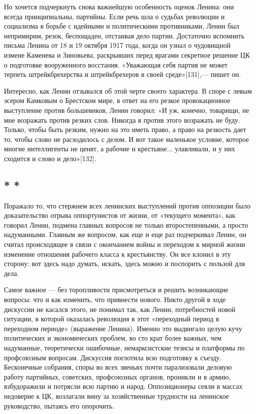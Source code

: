\documentclass[12pt, a4paper, openany]{book}
\begin{document}
Но хочется подчеркнуть снова важнейшую особенность оценок Ленина: они всегда принципиальны, партийны. Если речь шла о судьбах революции и социализма в борьбе с идейными и политическими противниками, Ленин был непримирим, резок, беспощаден, отстаивая дело партии. Достаточно вспомнить письма Ленина от 18 и 19 октября 1917 года, когда он узнал о чудовищной измене Каменева и Зиновьева, раскрывших перед врагами секретное решение ЦК о подготовке вооруженного восстания. «Уважающая себя партия не может терпеть штрейкбрехерства и штрейкбрехеров в своей среде»[131],— пишет он.

Интересно, как Ленин отзывался об этой черте своего характера. В споре с левым эсером Камковым о Брестском мире, в ответ на его резкое провокационное выступление против большевиков, Ленин говорил: «И уж, конечно, товарищи, не мне возражать против резких слов. Никогда я против этого возражать не буду. Только, чтобы быть резким, нужно на это иметь право, а право на резкость дает то, чтобы слово не расходилось с делом. И вот такое маленькое условие, которое многие интеллигенты не ценят, а рабочие и крестьяне... улавливали, и у них сходится и слово и дело»[132].

\subsection*{\center * * *}

Поражало то, что стержнем всех ленинских выступлений против оппозиции было доказательство отрыва оппортунистов от жизни, от «текущего момента», как говорил Ленин, подмена главных вопросов не только второстепенными, а просто надуманными. Главным же вопросом, как еще и еще раз подчеркивал Ленин, он считал происходящее в связи с окончанием войны и переходом к мирной жизни изменение отношения рабочего класса к крестьянству. Он все клонил в эту сторону: вот здесь надо думать, искать, здесь можно и поспорить с пользой для дела.

Самое важное — без торопливости присмотреться и решить возникающие вопросы: что и как изменить, что привнести нового. Никто другой в ходе дискуссии не касался этого, не понимал так, как Ленин, потребностей новой ситуации, в которой оказалась революция в этот «переходный период в переходном периоде» (выражение Ленина). Именно это выдвигало целую кучу политических и экономических проблем, во сто крат более важных, чем надуманные, теоретически ошибочные, немарксистские тезисы и платформы по профсоюзным вопросам. Дискуссия поглотила всю подготовку к съезду. Бесконечные собрания, споры во всех звеньях почти парализовали деловую работу партийных, советских, профсоюзных органов, проникли и в армию, взбудоражили и потрясли всю партию и народ. Оппозиционеры сеяли в массах недоверие к ЦК, возлагали вину за хозяйственные трудности на ленинское руководство, пытаясь его опорочить.
\end{document}
